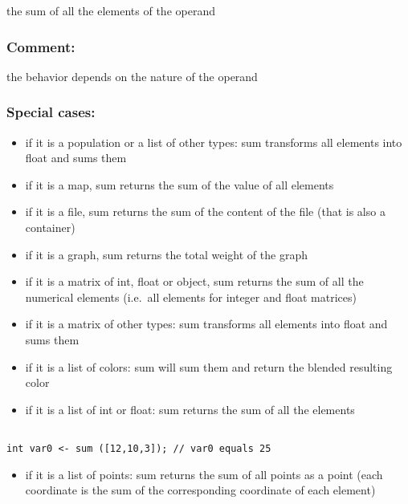 \documentclass[]{book}
\providecommand{\tightlist}{%
  \setlength{\itemsep}{0pt}\setlength{\parskip}{0pt}}
\theoremstyle{definition}
\theoremstyle{definition}
\theoremstyle{definition}
\theoremstyle{remark}
\begin{document}
the sum of all the elements of the operand

\subsubsection{Comment:}\label{comment-96}

the behavior depends on the nature of the operand

\subsubsection{Special cases:}\label{special-cases-132}

\begin{itemize}
\tightlist
\item
  if it is a population or a list of other types: sum transforms all
  elements into float and sums them\\
\item
  if it is a map, sum returns the sum of the value of all elements\\
\item
  if it is a file, sum returns the sum of the content of the file (that
  is also a container)\\
\item
  if it is a graph, sum returns the total weight of the graph\\
\item
  if it is a matrix of int, float or object, sum returns the sum of all
  the numerical elements (i.e.~all elements for integer and float
  matrices)\\
\item
  if it is a matrix of other types: sum transforms all elements into
  float and sums them\\
\item
  if it is a list of colors: sum will sum them and return the blended
  resulting color\\
\item
  if it is a list of int or float: sum returns the sum of all the
  elements
\end{itemize}

\begin{verbatim}
 
int var0 <- sum ([12,10,3]); // var0 equals 25
\end{verbatim}

\begin{itemize}
\tightlist
\item
  if it is a list of points: sum returns the sum of all points as a
  point (each coordinate is the sum of the corresponding coordinate of
  each element)
\end{itemize}
\end{document}
